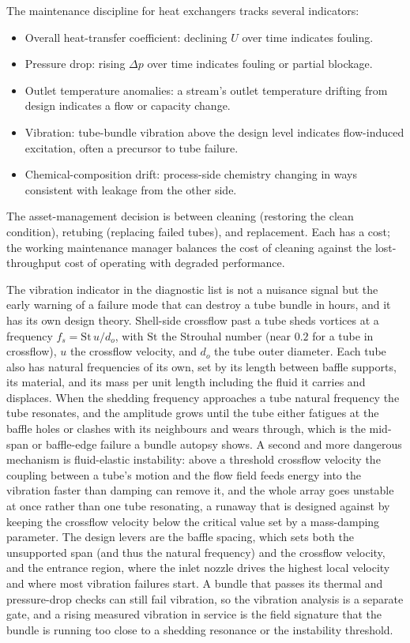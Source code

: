 The maintenance discipline for heat exchangers tracks several
indicators:

\begin{itemize}[leftmargin=*]
  \item Overall heat-transfer coefficient: declining $U$ over time
    indicates fouling.
  \item Pressure drop: rising $\Delta p$ over time indicates fouling
    or partial blockage.
  \item Outlet temperature anomalies: a stream's outlet temperature
    drifting from design indicates a flow or capacity change.
  \item Vibration: tube-bundle vibration above the design level
    indicates flow-induced excitation, often a precursor to tube
    failure.
  \item Chemical-composition drift: process-side chemistry changing
    in ways consistent with leakage from the other side.
\end{itemize}

The asset-management decision is between cleaning (restoring the
clean condition), retubing (replacing failed tubes), and
replacement. Each has a cost; the working maintenance manager
balances the cost of cleaning against the lost-throughput cost of
operating with degraded performance.

\begin{mastery}
The vibration indicator in the diagnostic list is not a nuisance signal but the
early warning of a failure mode that can destroy a tube bundle in hours, and it has
its own design theory. Shell-side crossflow past a tube sheds vortices at a
frequency $f_s = \mathrm{St}\,u/d_o$, with $\mathrm{St}$ the Strouhal number (near
$0.2$ for a tube in crossflow), $u$ the crossflow velocity, and $d_o$ the tube outer
diameter. Each tube also has natural frequencies of its own, set by its length
between baffle supports, its material, and its mass per unit length including the
fluid it carries and displaces. When the shedding frequency approaches a tube
natural frequency the tube resonates, and the amplitude grows until the tube either
fatigues at the baffle holes or clashes with its neighbours and wears through, which
is the mid-span or baffle-edge failure a bundle autopsy shows. A second and more
dangerous mechanism is fluid-elastic instability: above a threshold crossflow
velocity the coupling between a tube's motion and the flow field feeds energy into
the vibration faster than damping can remove it, and the whole array goes unstable
at once rather than one tube resonating, a runaway that is designed against by
keeping the crossflow velocity below the critical value set by a mass-damping
parameter. The design levers are the baffle spacing, which sets both the unsupported
span (and thus the natural frequency) and the crossflow velocity, and the entrance
region, where the inlet nozzle drives the highest local velocity and where most
vibration failures start. A bundle that passes its thermal and pressure-drop checks
can still fail vibration, so the vibration analysis is a separate gate, and a rising
measured vibration in service is the field signature that the bundle is running too
close to a shedding resonance or the instability threshold.
\end{mastery}

